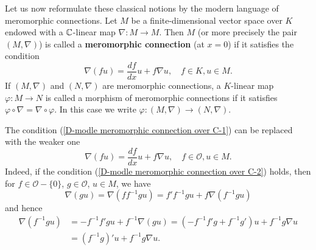 Let us now reformulate these classical notions by the modern language of meromorphic connections. Let $M$ be a finite-dimensional vector space over $K$ endowed with a $\mathbb{C}$-linear map $\nabla:M\to M$. Then $M$ (or more precisely the pair $(M,\nabla)$) is called a \textbf{meromorphic connection} (at $x=0$) if it satisfies the condition
\begin{equation}\label{D-modle meromorphic connection over C-1}
\nabla(fu)=\frac{df}{dx}u+f\nabla u,\quad f\in K,u\in M.
\end{equation}
If $(M,\nabla)$ and $(N,\nabla)$ are meromorphic connections, a $K$-linear map $\varphi:M\to N$ is called a morphism of meromorphic connections if it satisfies $\varphi\circ\nabla=\nabla\circ\varphi$. In this case we write $\varphi:(M,\nabla)\to (N,\nabla)$.
\begin{remark}
The condition (\ref{D-modle meromorphic connection over C-1}) can be replaced with the weaker one
\begin{equation}\label{D-modle meromorphic connection over C-2}
\nabla(fu)=\frac{df}{dx}u+f\nabla u,\quad f\in \mathscr{O},u\in M.
\end{equation}
Indeed, if the condition (\ref{D-modle meromorphic connection over C-2}) holds, then for $f\in\mathscr{O}-\{0\}$, $g\in\mathscr{O}$, $u\in M$, we have
\[\nabla(gu)=\nabla(ff^{-1}gu)=f'f^{-1}gu+f\nabla(f^{-1}gu)\]
and hence
\begin{align*}
\nabla(f^{-1}gu)&=-f^{-1}f'gu+f^{-1}\nabla(gu)=(-f^{-1}f'g+f^{-1}g')u+f^{-1}g\nabla u\\
&=(f^{-1}g)'u+f^{-1}g\nabla u.
\end{align*}
\end{remark}

